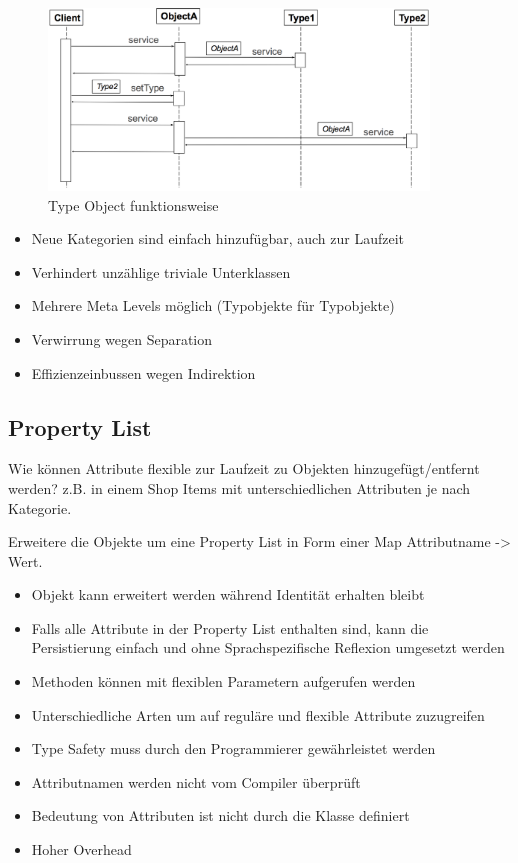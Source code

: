 \begin{figure}[H]
	\centering
	\includegraphics[width=0.9\textwidth]{content/advancedPatterns/typeobject.png}
	\caption{Type Object funktionsweise}
\end{figure}

\begin{itemize}
	\item Neue Kategorien sind einfach hinzufügbar, auch zur Laufzeit
	\item Verhindert unzählige triviale Unterklassen
	\item Mehrere Meta Levels möglich (Typobjekte für Typobjekte)
	\item Verwirrung wegen Separation
	\item Effizienzeinbussen wegen Indirektion
\end{itemize}

\subsection{Property List}

Wie können Attribute flexible zur Laufzeit zu Objekten hinzugefügt/entfernt werden? z.B. in einem Shop Items mit unterschiedlichen Attributen je nach Kategorie.

Erweitere die Objekte um eine Property List in Form einer Map Attributname -> Wert.

\begin{itemize}
	\item Objekt kann erweitert werden während Identität erhalten bleibt
	\item Falls alle Attribute in der Property List enthalten sind, kann die Persistierung einfach und ohne Sprachspezifische Reflexion umgesetzt werden
	\item Methoden können mit flexiblen Parametern aufgerufen werden
	\item Unterschiedliche Arten um auf reguläre und flexible Attribute zuzugreifen
	\item Type Safety muss durch den Programmierer gewährleistet werden
	\item Attributnamen werden nicht vom Compiler überprüft
	\item Bedeutung von Attributen ist nicht durch die Klasse definiert
	\item Hoher Overhead
\end{itemize}

